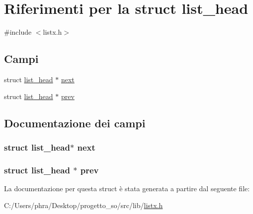 \hypertarget{structlist__head}{\section{Riferimenti per la struct list\-\_\-head}
\label{structlist__head}
}


{\ttfamily \#include $<$listx.\-h$>$}

\subsection*{Campi}
\begin{DoxyCompactItemize}
\item 
struct \hyperlink{structlist__head}{list\-\_\-head} $\ast$ \hyperlink{structlist__head_ad6116fd07816a828c3a9830f54871bd0}{next}
\item 
struct \hyperlink{structlist__head}{list\-\_\-head} $\ast$ \hyperlink{structlist__head_ad8f06cb209b17c3a4a5b24cad8793f72}{prev}
\end{DoxyCompactItemize}


\subsection{Documentazione dei campi}
\hypertarget{structlist__head_ad6116fd07816a828c3a9830f54871bd0}{
\subsubsection[{next}]{\setlength{\rightskip}{0pt plus 5cm}struct {\bf list\-\_\-head}$\ast$ next}}\label{structlist__head_ad6116fd07816a828c3a9830f54871bd0}
\hypertarget{structlist__head_ad8f06cb209b17c3a4a5b24cad8793f72}{
\subsubsection[{prev}]{\setlength{\rightskip}{0pt plus 5cm}struct {\bf list\-\_\-head} $\ast$ prev}}\label{structlist__head_ad8f06cb209b17c3a4a5b24cad8793f72}


La documentazione per questa struct è stata generata a partire dal seguente file\-:\begin{DoxyCompactItemize}
\item 
C\-:/\-Users/phra/\-Desktop/progetto\-\_\-so/src/lib/\hyperlink{listx_8h}{listx.\-h}\end{DoxyCompactItemize}

